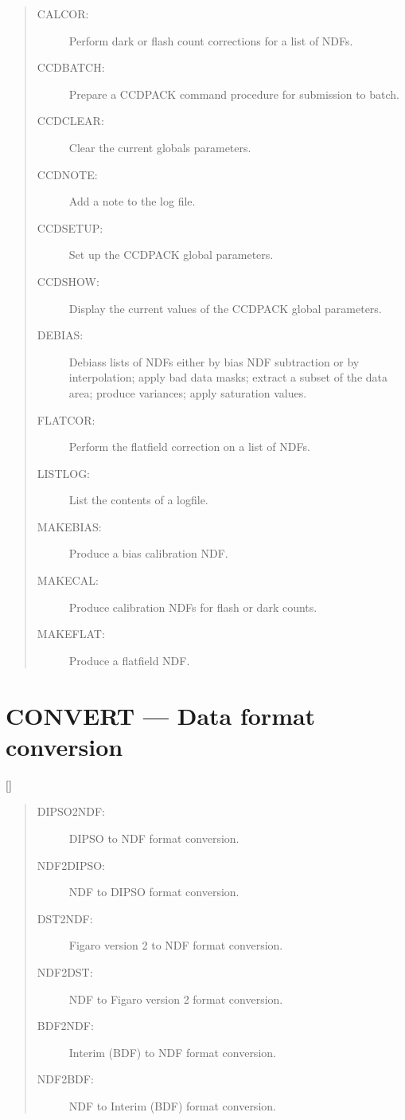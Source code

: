 \begin{quote}
\begin{description}
\item [CALCOR:]  Perform dark or flash count corrections for a list of NDFs.
\item [CCDBATCH:]  Prepare a CCDPACK command procedure for submission to batch.
\item [CCDCLEAR:]  Clear the current globals parameters.
\item [CCDNOTE:]  Add a note to the log file.
\item [CCDSETUP:]  Set up the CCDPACK global parameters.
\item [CCDSHOW:]  Display the current values of the CCDPACK global parameters.
\item [DEBIAS:]  Debiass lists of NDFs either by bias NDF subtraction or by
 interpolation; apply bad data masks; extract a subset of the data area;
 produce variances; apply saturation values.
\item [FLATCOR:]  Perform the flatfield correction on a list of NDFs.
\item [LISTLOG:]  List the contents of a logfile.
\item [MAKEBIAS:]  Produce a bias calibration NDF.
\item [MAKECAL:]  Produce calibration NDFs for flash or dark counts.
\item [MAKEFLAT:]  Produce a flatfield NDF.
\end{description}
\end{quote}

\newpage

\section{CONVERT --- Data format conversion}

\vspace{-10mm}

\hfill []

\vspace{2mm}

\begin{quote}
\begin{description}
\item [DIPSO2NDF:]  DIPSO to NDF format conversion.
\item [NDF2DIPSO:]  NDF to DIPSO format conversion.
\\
\item [DST2NDF:]  Figaro version 2 to NDF format conversion.
\item [NDF2DST:]  NDF to Figaro version 2 format conversion.
\\
\item [BDF2NDF:]  Interim (BDF) to NDF format conversion.
\item [NDF2BDF:]  NDF to Interim (BDF) format conversion.
\end{description}
\end{quote}

